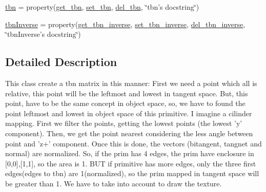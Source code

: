\begin{DoxyCompactItemize}
\item 
\hyperlink{classdestruction_1_1_create_t_b_n_1_1_create_t_b_n_aa44fc92977c3cf7ba557a28f12b6f838}{tbn} = property(\hyperlink{classdestruction_1_1_create_t_b_n_1_1_create_t_b_n_a7b2494ff6c01e256de108c6223bd5550}{get\-\_\-tbn}, \hyperlink{classdestruction_1_1_create_t_b_n_1_1_create_t_b_n_aac120d79c09a56e88dba8852539b9144}{set\-\_\-tbn}, \hyperlink{classdestruction_1_1_create_t_b_n_1_1_create_t_b_n_a183c396862de3c010815c79ff892176c}{del\-\_\-tbn}, \char`\"{}tbn's docstring\char`\"{})
\item 
\hyperlink{classdestruction_1_1_create_t_b_n_1_1_create_t_b_n_ab55311957758a6665a2d217f796fcfac}{tbn\-Inverse} = property(\hyperlink{classdestruction_1_1_create_t_b_n_1_1_create_t_b_n_a03638e3aeb3a3764e90dff3de9bc25b0}{get\-\_\-tbn\-\_\-inverse}, \hyperlink{classdestruction_1_1_create_t_b_n_1_1_create_t_b_n_a35a29bd5c3e137c7668d99a14bdea521}{set\-\_\-tbn\-\_\-inverse}, \hyperlink{classdestruction_1_1_create_t_b_n_1_1_create_t_b_n_a54bc8b5a6d1be6e7f1a98eb08547fbf8}{del\-\_\-tbn\-\_\-inverse}, \char`\"{}tbn\-Inverse's docstring\char`\"{})
\end{DoxyCompactItemize}


\subsection{Detailed Description}
\begin{DoxyVerb}This class create a tbn matrix in this manner:
First we need a point which all is relative, this point will be the leftmost and lowest
in tangent space. But, this point, have to be the same concept in object space, so, we
have to found the point leftmost and lowest in object space of this primitive. I imagine
a cilinder mapping. First we filter the points, getting the lowest points (the lowest 'y'
component). Then, we get the point nearest considering the less angle between point and
'z+' component.
Once this is done, the vectors (bitangent, tangnet and normal) are normalized. So,
if the prim has 4 edges, the prim have enclosure in [0,0],[1,1], so the area is 1. BUT
if primitive has more edges, only the three first edges(edges to tbn) are 1(normalized),
so the prim mapped in tangent space will be greater than 1. We have to take into account 
to draw the texture.
\end{DoxyVerb}
 

